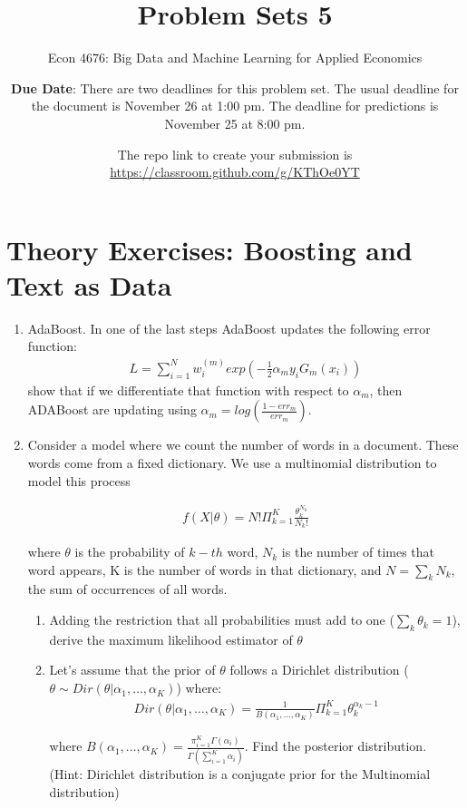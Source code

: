 \documentclass[12pt,onecolumn]{article}
\title{Problem Sets 5}
\subtitle{Econ 4676: Big Data and Machine Learning for Applied Economics}
\author{{\bf Due Date}: There are two deadlines for this problem set. The usual deadline for the document is November 26 at 1:00 pm. The deadline for predictions is November 25 at 8:00 pm. }
\date{}
\date{The repo link to create your submission is \url{https://classroom.github.com/g/KThOe0YT}}
\begin{document}
\maketitle

\section{Theory Exercises: Boosting and Text as Data}

\begin{enumerate}
  \item AdaBoost. In one of the last steps AdaBoost updates the following error function:
   \begin{align}
   L=\sum_{i=1}^N w^{(m)}_i exp\left(-\frac{1}{2}\alpha_m y_i G_m(x_i)\right)
   \end{align}
 show that if we differentiate that function with respect to $\alpha_m$, then ADABoost are updating using $\alpha_m=log(\frac{1-err_m}{err_m})$. 

\item Consider a model where we count the number of words in a document. These words come from a fixed dictionary. We use a multinomial distribution to model this process

\begin{align}
f(X|\theta) = N! \Pi_{k=1}^K \frac{\theta_k^{N_k}}{N_k!}
\end{align}

where $\theta$ is the probability of $k-th$ word, $N_k$ is the number of times that word appears, K is the number of words in that dictionary, and $N=\sum_k N_k$, the sum of occurrences of all words.

\begin{enumerate}
  \item Adding the restriction that all probabilities must add to one ($\sum_k\theta_k=1$), derive the maximum likelihood estimator of $\theta$
  \item Let's assume that the prior of $\theta$ follows a Dirichlet distribution ($\theta\sim Dir(\theta|\alpha _{1},\ldots ,\alpha _{K})$) where:
  \begin{align}
    Dir(\theta|\alpha _{1},\ldots ,\alpha _{K}) =\frac{1}{B(\alpha _{1},\ldots ,\alpha _{K})} \Pi_{k=1}^K \theta_k^{\alpha_k-1}
  \end{align}

 where $ B(\alpha _{1},\ldots ,\alpha _{K})=\frac{\pi _{i=1}^{K} \Gamma(\alpha _{i})}{\Gamma \left(\sum _{i=1}^{K}\alpha _{i}\right)}$. Find the posterior distribution. (Hint: Dirichlet distribution is a conjugate prior for the Multinomial distribution)


\end{enumerate}
\end{enumerate}
\end{document}
